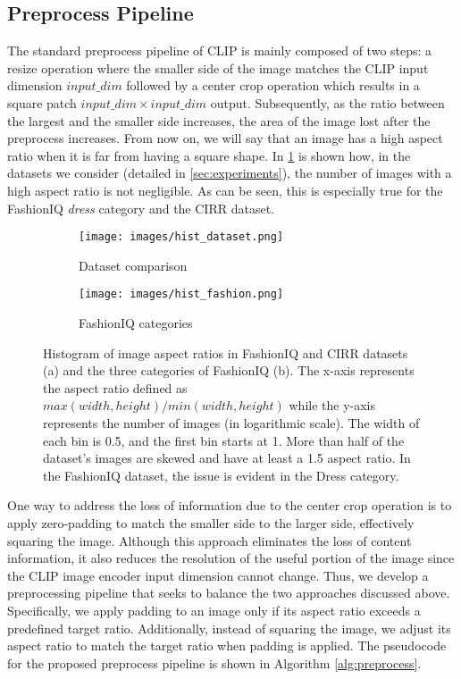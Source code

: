 \documentclass[acmlarge]{acmart}
\begin{document}
\subsection{Preprocess Pipeline}\label{sec:preprocess}
The standard preprocess pipeline of CLIP is mainly composed of two steps: a resize operation where the smaller side of the image matches the CLIP input dimension $input\_dim$ followed by a center crop operation which results in a square patch  $input\_dim\times input\_dim$ output.
Subsequently, as the ratio between the largest and the smaller side increases, the area of the image lost after the preprocess increases. From now on, we will say that an image has a high aspect ratio when it is far from having a square shape.
In \cref{fig:hist_plot} is shown how, in the datasets we consider (detailed in \cref{sec:experiments}), the number of images with a high aspect ratio is not negligible. As can be seen, this is especially true for the FashionIQ \emph{dress} category and the CIRR dataset.


\begin{figure}[tb]
       \centering
    \begin{subfigure}{0.45\linewidth}
    \texttt{[image: images/hist\_dataset.png]}
    \caption{Dataset comparison}
    \end{subfigure}\hfill
 \begin{subfigure}{0.45\linewidth}
    \texttt{[image: images/hist\_fashion.png]}
    \caption{FashionIQ categories}
    \end{subfigure}
     \vspace{-1.8ex}
    \caption{Histogram of image aspect ratios in FashionIQ and CIRR datasets (a) and the three categories of FashionIQ (b). The x-axis represents the aspect ratio defined as $max(width, height) / min(width, height)$ while the y-axis represents the number of images (in logarithmic scale). The width of each bin is 0.5, and the first bin starts at 1. More than half of the dataset's images are skewed and have at least a 1.5 aspect ratio. In the FashionIQ dataset, the issue is evident in the Dress category.}
    \label{fig:hist_plot}
    \vspace{-3ex}
\end{figure}

One way to address the loss of information due to the center crop operation is to apply zero-padding to match the smaller side to the larger side, effectively squaring the image. 
Although this approach eliminates the loss of content information, it also reduces the resolution of the useful portion of the image since the CLIP image encoder input dimension cannot change.
Thus, we develop a preprocessing pipeline that seeks to balance the two approaches discussed above. Specifically, we apply padding to an image only if its aspect ratio exceeds a predefined target ratio. Additionally, instead of squaring the image, we adjust its aspect ratio to match the target ratio when padding is applied.
The pseudocode for the proposed preprocess pipeline is shown in Algorithm \ref{alg:preprocess}.
\end{document}
